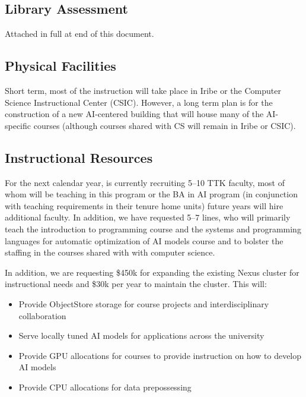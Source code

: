 
\newcommand{\ptkfaculty}{5--7}
\newcommand{\ttkfaculty}{5--10}
\newcommand{\advisors}{5}
\newcommand{\admin}{1}
\newcommand{\cloud}{30k}
\newcommand{\upfrontcluster}{450k}
\newcommand{\continuingcluster}{30k}

\subsection{Library Assessment}

Attached in full at end of this document.

\subsection{Physical Facilities}

Short term, most of the instruction will take place in Iribe or the Computer Science Instructional Center (CSIC).  However, a long term plan is for the construction of a new AI-centered building that will house many of the AI-specific courses (although courses shared with CS will remain in Iribe or CSIC).

\subsection{Instructional Resources}

For the next calendar year, \aim{} is currently recruiting \ttkfaculty{} TTK faculty, most of whom will be teaching in this program or the BA in AI program (in conjunction with teaching requirements in their tenure home units) future years will hire additional faculty.  In addition, we have requested \ptkfaculty{} lines, who will primarily teach the introduction to programming course and the systems and programming languages for automatic optimization of AI models course and to bolster the staffing in the courses shared with with computer science.

In addition, we are requesting \$\upfrontcluster{} for expanding the existing Nexus cluster for instructional needs and \$\continuingcluster{} per year to maintain the cluster.  This will:
\begin{itemize}
    \item Provide ObjectStore storage for course projects and interdisciplinary collaboration
    \item Serve locally tuned AI models for applications across the university
    \item Provide GPU allocations for courses to provide instruction on how to develop AI models
    \item Provide CPU allocations for data prepossessing
\end{itemize}


